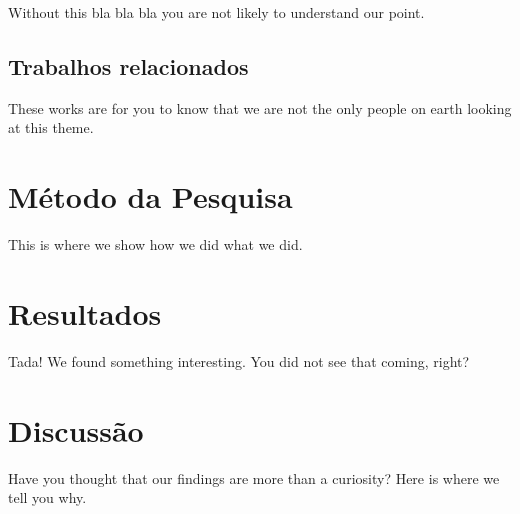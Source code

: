 \documentclass[sigconf]{acmart}
\begin{document}
Without this bla bla bla you are not likely to understand our point.





\subsection{Trabalhos relacionados}

These works are for you to know that we are not the only people on earth looking at this theme.









\section{Método da Pesquisa}

This is where we show how we did what we did.














\section{Resultados}

Tada! We found something interesting. You did not see that coming, right?











\section{Discussão}

Have you thought that our findings are more than a curiosity? Here is where we tell you why.
\end{document}
